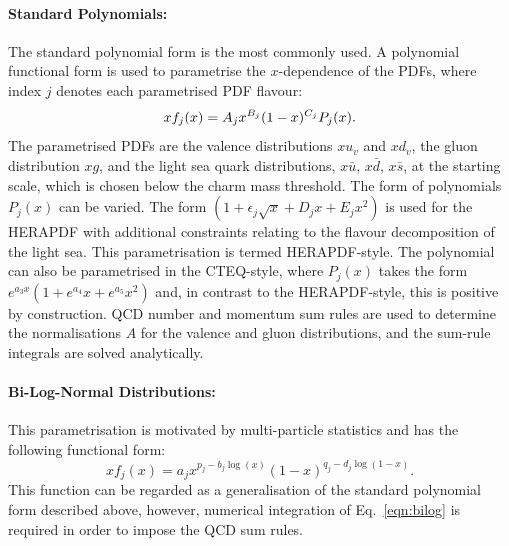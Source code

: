 \paragraph{Standard Polynomials:} 
The standard polynomial form is the most commonly used. A polynomial functional form is used to parametrise the $x$-dependence of the PDFs, where index $j$ denotes each parametrised PDF flavour:
\begin{equation}
\centering
 xf_j(x) = A_j x^{B_j} (1-x)^{C_j} P_j(x).
\label{eqn:pdf_std}
\end{equation}
The parametrised PDFs are the valence distributions
$xu_v$ and $xd_v$, the gluon distribution $xg$, and the light sea quark distributions,
$x\bar{u}$, $x\bar{d}$,
$x\bar{s}$, 
at the starting scale, which is 
chosen below the charm mass threshold. 
The form of polynomials $P_j(x)$ can be varied.
The form $(1 + \epsilon_j \sqrt{x} + D_j x + E_j x^2)$
is used for the HERAPDF \cite{h1zeus:2009wt} 
with additional constraints relating to the flavour decomposition of the 
light sea. This parametrisation is termed HERAPDF-style. The polynomial can also
be parametrised in the CTEQ-style, where $P_j(x)$ takes the form $e^{a_3x} (1 + e^{a_4} x + e^{a_5} x^2)$ and,
in contrast to  the HERAPDF-style, this is positive by construction.
QCD number and momentum sum rules are used to determine the normalisations $A$ for the valence and gluon
distributions, and the sum-rule integrals are solved analytically.
\paragraph{Bi-Log-Normal Distributions:} 
This parametrisation is motivated by multi-particle statistics
and has the following functional form:
\begin{equation}
 xf_j(x)=a_j x^{p_j-b_j\log(x)}(1-x)^{q_j-d_j \log(1-x)}.
\label{eqn:bilog}
\end{equation}
This function can be regarded as a generalisation of the standard polynomial form described above,
however, numerical integration of Eq.~\ref{eqn:bilog} is required in order to impose the QCD sum rules.
